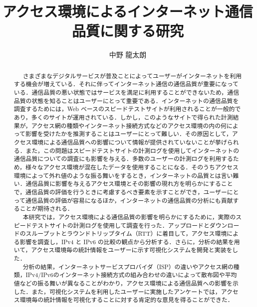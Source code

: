 \documentclass[12pt]{mthesis_utf8}
\title{アクセス環境によるインターネット通信品質に関する研究}
\author{中野 龍太朗}
\begin{document}
\maketitle
\begin{abstract}
~~~さまざまなデジタルサービスが普及ことによってユーザーがインターネットを利用する機会が増えている．それに伴ってインターネット通信の通信品質が重要になっている．通信品質の悪い状態ではサービスを満足に利用することができないため，通信品質の状態を知ることはユーザーにとって重要である．インターネットの通信品質を調査するためには，Web ベースのスピードテストサイトが利用されることが一般的であり，多くのサイトが運用されている．しかし，このようなサイトで得られた計測結果が，アクセス網の種類やインターネット接続方式などのアクセス環境の内の何によって影響を受けたかを推測することはユーザーにとって難しい．その原因として，アクセス環境による通信品質への影響について情報が提供されていないことが挙げられる．また，この問題はスピードテストサイトの計測ログを使用してインターネットの通信品質についての調査にも影響を与える．多数のユーザーの計測ログを利用するため，様々なアクセス環境が混在したデータを使用することになる．そのうちアクセス環境によって外れ値のような振る舞いをするとき，インターネットの品質とは言い難い．通信品質に影響を与えるアクセス環境とその影響の現れ方を明らかにすることで，通信品質の評価を行うときに考慮するべき要素を示すことができ，ユーザーにとって通信品質の評価が容易になるほか，インターネットの通信品質の分析にも貢献することが期待される．\\
~~~本研究では，アクセス環境による通信品質の影響を明らかにするために，実際のスピードテストサイトの計測ログを使用して調査を行った．アップロードとダウンロードのスループットとラウンドトリップタイム（RTT）に着目して，アクセス環境による影響を調査し，IPv4 と IPv6 の比較の観点から分析する．さらに，分析の結果を用いて，アクセス環境毎の統計情報をユーザーに示す可視化システムを開発と実装をした．\\
~~~分析の結果，インターネットサービスプロバイダ（ISP）の違いやアクセス網の種類，IPv4/IPv6のインターネット接続方式の組み合わせの違いによって散布図や平均値などの振る舞いが異なることがわかり，アクセス環境による通信品質への影響を示した．また，可視化システムを利用したユーザーに実施したアンケートでは，アクセス環境毎の統計情報を可視化することに対する肯定的な意見を得ることができた．
\end{abstract}
\end{document}
